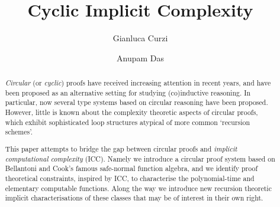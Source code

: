 \documentclass[manuscript,screen]{acmart}
\theoremstyle{definition}
\theoremstyle{remark}
\begin{document}
\title{Cyclic Implicit Complexity}

\author{Gianluca Curzi}

\author{Anupam Das}



\renewcommand{\shortauthors}{G.~Curzi and A.~Das}

\begin{abstract}
  \emph{Circular} (or \emph{cyclic}) proofs have received increasing attention in recent years, and have been proposed as an alternative setting for studying (co)inductive reasoning. 
    In particular, now several type systems based on circular reasoning have been proposed.
    However, little is known about the complexity theoretic aspects of circular proofs, which exhibit sophisticated loop structures atypical of more common `recursion schemes'. 
    
    This paper attempts to bridge the gap between circular proofs and \emph{implicit computational complexity} (ICC). 
    Namely we introduce a circular proof system based on Bellantoni and Cook's famous safe-normal function algebra, and we identify proof theoretical constraints, inspired by ICC, to characterise the polynomial-time and elementary computable functions.
    Along the way we introduce new recursion theoretic implicit characterisations of these classes that may be of interest in their own right.
\end{abstract}
\end{document}
